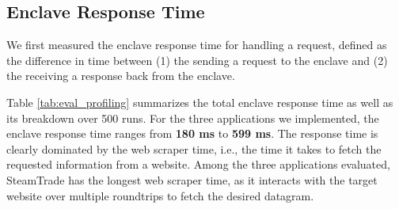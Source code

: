 \subsection{Enclave Response Time}
\label{subsec:response time}
We first measured the enclave response time for handling a \tc request, defined as the difference in time between (1)  
the \medname sending a request to the enclave 
and (2) the \medname receiving a response back from the enclave. 

Table \ref{tab:eval_profiling} summarizes the total enclave response time as
well as its breakdown over 500 runs.  For the three applications we
implemented, the enclave response time ranges from {\bf 180 ms} to {\bf 599 ms}.
The response time is clearly dominated by the web scraper time, i.e., the time
it takes to fetch the requested information from a website.  Among the three
applications evaluated, {\sf SteamTrade} has the longest web scraper time, as it interacts with the target website
over multiple roundtrips to fetch the desired datagram.



